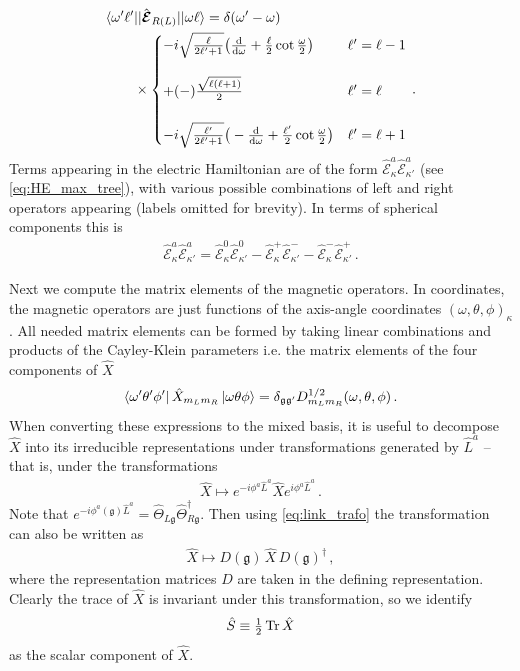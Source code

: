 \documentclass[reprint,superscriptaddress,pra,nofootinbib,preprintnumbers,floatfix]{revtex4-1}
\providecommand{\g}{{\mathfrak{g}}}
\providecommand{\df}{{\rm d}}
\begin{document}
%
\begin{align}\label{eq:elec_mat_elements}
\begin{split}
    & \langle \omega'\ell' \vert \vert \hat{\bm{\mathcal{E}}}_{R(L)} \vert\vert \omega \ell \rangle = \delta(\omega'-\omega)\\
 & \qquad \times
    \begin{cases}
    -i \sqrt{\frac{\ell}{2\ell'+1}} \big( \frac{\df }{\df \omega} + \frac{\ell}{2}\cot\frac{\omega}{2} \big) & \ell'=\ell-1 \\[15pt]
    +(-)\frac{\sqrt{\ell(\ell+1)}}{2} & \ell'=\ell \\[15pt]
    -i \sqrt{\frac{\ell'}{2\ell'+1}} \big( -\frac{\df }{\df \omega} + \frac{\ell'}{2}\cot\frac{\omega}{2} \big) & \ell'= \ell+1
    \end{cases}
    \,.
\end{split}
\end{align}
%
Terms appearing in the electric Hamiltonian are of the form $\hat{\mathcal{E}}^a_\kappa \hat{\mathcal{E}}^a_{\kappa'}$ (see \cref{eq:HE_max_tree}), with various possible combinations of left and right operators appearing (labels omitted for brevity). 
%
In terms of spherical components this is
%
\begin{align}
    \hat{\mathcal{E}}^a_\kappa \hat{\mathcal{E}}^a_{\kappa'} = \hat{\mathcal{E}}^0_\kappa \hat{\mathcal{E}}^0_{\kappa'} - \hat{\mathcal{E}}^+_\kappa \hat{\mathcal{E}}^-_{\kappa'}
    - \hat{\mathcal{E}}^-_\kappa \hat{\mathcal{E}}^+_{\kappa'}
    \,.
\end{align}


Next we compute the matrix elements of the magnetic operators. 
%
In coordinates, the magnetic operators are just functions of the axis-angle coordinates $(\omega,\theta,\phi)_\kappa$. 
%
All needed matrix elements can be formed by taking linear combinations and products of the Cayley-Klein parameters i.e. the matrix elements of the four components of $\hat{X}$
%
\begin{align}
    \bra{\omega'\theta'\phi'}\hat{X}_{{m_L}{m_R}}\ket{\omega\theta\phi} = \delta_{\g \g'}D^{1/2}_{{m_L}{m_R}}(\omega,\theta,\phi)
    \,.
\end{align}
%
When converting these expressions to the mixed basis, it is useful to decompose $\hat{X}$ into its irreducible representations under transformations generated by $\hat{L}^a$ -- that is, under the transformations
%
\begin{align}
    \hat{X} \mapsto e^{-i\phi^a \hat{L}^a} \hat{X} e^{i\phi^a \hat{L}^a}
    \,.
\end{align}
%
Note that $e^{-i\phi^a(\g) \hat{L}^a} = \hat{\Theta}_{L\g}\hat{\Theta}^\dagger_{R\g}$. 
%
Then using \cref{eq:link_trafo} the transformation can also be written as
%
\begin{align}
    \hat{X} \mapsto D(\g) \, \hat{X} \, D(\g)^\dagger
    \,,
\end{align}
%
where the representation matrices $D$ are taken in the defining representation. 
%
Clearly the trace of $\hat{X}$ is invariant under this transformation, so we identify
%
\begin{align}
    \hat{S} \equiv \tfrac{1}{2}\Tr \hat{X}
\end{align}
%
as the scalar component of $\hat{X}$.
\end{document}
